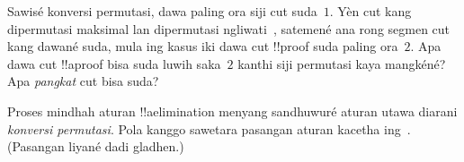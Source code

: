 \documentclass[../../../include/open-logic-section]{subfiles}
\begin{document}
\begin{prob}
Sawisé konversi permutasi, dawa paling ora siji cut suda~$1$.
Yèn cut kang dipermutasi maksimal lan \Elim{\land} dipermutasi
ngliwati~\Elim{\lor}, satemené
ana rong segmen cut kang dawané suda, mula ing kasus iki dawa cut
!!{proof} suda paling ora~$2$. Apa dawa cut !!a{proof} bisa
suda luwih saka~$2$ kanthi siji permutasi kaya mangkéné?
Apa \emph{pangkat} cut bisa suda?
\end{prob}

Proses mindhah aturan !!a{elimination} menyang sandhuwuré aturan
\Elim{\lor} utawa \Elim{\lexists} diarani
\emph{konversi permutasi}. Pola kanggo sawetara pasangan aturan
kacetha ing~. (Pasangan liyané
dadi gladhen.) 

\end{document}
